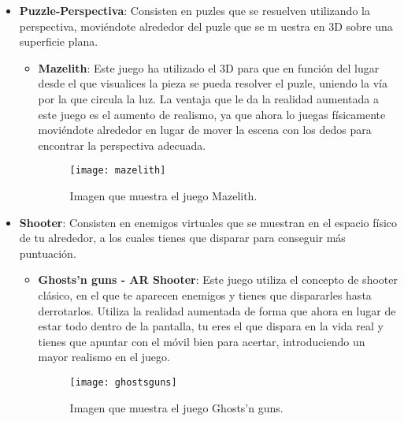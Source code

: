 \begin{itemize}
  \item \textbf{Puzzle-Perspectiva}: Consisten en puzles que se resuelven utilizando la perspectiva, moviéndote alrededor del puzle que se m uestra en 3D sobre una superficie plana.
  \begin{itemize}
    \item \textbf{Mazelith}: Este juego ha utilizado el 3D para que en función del lugar desde el que visualices la pieza se pueda resolver el puzle, uniendo la vía por la que circula la luz. La ventaja que le da la realidad aumentada a este juego es el aumento de realismo, ya que ahora lo juegas físicamente moviéndote alrededor en lugar de mover la escena con los dedos para encontrar la perspectiva adecuada.

    \begin{figure}[h]
      \centering
      \texttt{[image: mazelith]}
      \caption{Imagen que muestra el juego Mazelith.\protect\footnotemark}
      \label{figura-mazelith}
    \end{figure}

  \end{itemize}

  \item \textbf{Shooter}: Consisten en enemigos virtuales que se muestran en el espacio físico de tu alrededor, a los cuales tienes que disparar para conseguir más puntuación.

  \begin{itemize}
    \item \textbf{Ghosts’n guns - AR Shooter}: Este juego utiliza el concepto de shooter clásico, en el que te aparecen enemigos y tienes que dispararles hasta derrotarlos. Utiliza la realidad aumentada de forma que ahora en lugar de estar todo dentro de la pantalla, tu eres el que dispara en la vida real y tienes que apuntar con el móvil bien para acertar, introduciendo un mayor realismo en el juego.

    \begin{figure}[h]
      \centering
      \texttt{[image: ghostsguns]}
      \caption{Imagen que muestra el juego Ghosts'n guns.\protect\footnotemark}
      \label{figura-ghosts-guns}
    \end{figure}

  \end{itemize}


\end{itemize}
